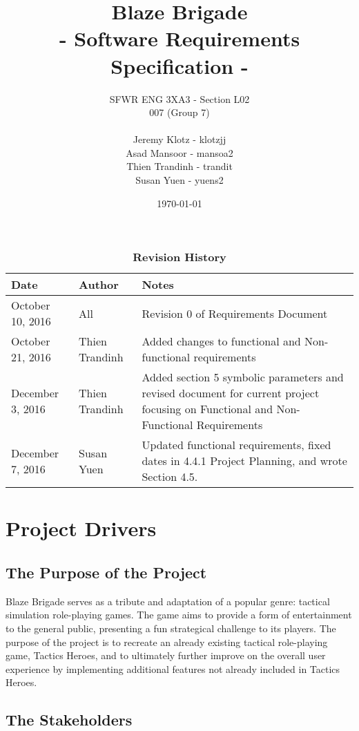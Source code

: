\documentclass{article}
\title{
    \vspace{40mm}
	\textbf {
	\Huge {\color[rgb]{0.9,0,0}Blaze} Brigade \\
	\large - Software Requirements Specification -}}
\date{\today}
\author{SFWR ENG 3XA3 - Section L02 \\
	007 (Group 7) \\ \\
	Jeremy Klotz - klotzjj \\
	Asad Mansoor - mansoa2 \\
	Thien Trandinh - trandit \\
	Susan Yuen - yuens2}
\begin{document}
\maketitle
{}
\newpage
{}

\tableofcontents
\listoftables
\listoffigures

\begin{table}[bp]
\caption{\bf Revision History}
\begin{tabularx}{\textwidth}{p{3cm}p{2cm}X}
    \toprule {\bf Date} & {\bf Author} & {\bf Notes} \\
    \midrule
    October 10, 2016 & All & Revision 0 of Requirements Document \\
    October 21, 2016 & Thien Trandinh & Added changes to functional and Non-functional  requirements \\
    December 3, 2016 & Thien Trandinh & Added section 5 symbolic parameters and revised document for current project focusing on Functional and Non-Functional Requirements \\
    December 7, 2016 & Susan Yuen & Updated functional requirements, fixed dates in 4.4.1 Project Planning, and wrote Section 4.5. \\
    \bottomrule
\end{tabularx}
\end{table}

\newpage

\section{Project Drivers}

\subsection{The Purpose of the Project}

Blaze Brigade serves as a tribute and adaptation of a popular genre: tactical simulation role-playing games. The game aims to provide a form of entertainment to the general public, presenting a fun strategical challenge to its players. The purpose of the project is to recreate an already existing tactical role-playing game, Tactics Heroes, and to ultimately further improve on the overall user experience by implementing additional features not already included in Tactics Heroes.

\subsection{The Stakeholders}
\end{document}

